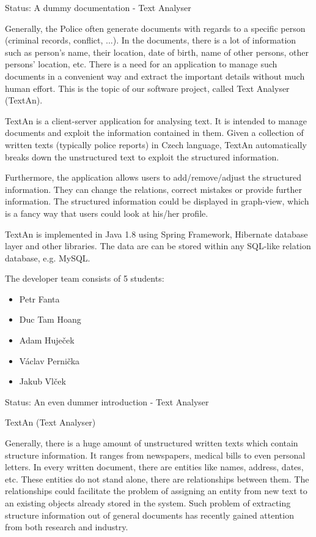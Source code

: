 Status: A dummy documentation - Text Analyser

Generally, the Police often generate documents with regards to a specific person (criminal records, conflict, ...). 
In the documents, there is a lot of information such as
person's name, their location, date of birth, name of other persons, other persons' location, etc.
There is a need for an application to manage such documents in a convenient way and extract the important details without much human effort.
This is the topic of our software project, called Text Analyser (TextAn).

TextAn is a client-server application for analysing text.
It is intended to manage documents and exploit the information contained in them.
Given a collection of written texts (typically police reports) in Czech language,
TextAn automatically breaks down the unstructured text to exploit the structured information. 

Furthermore, the application allows users to add/remove/adjust the structured information.
They can change the relations, correct mistakes or provide further information.
The structured information could be displayed in graph-view,
which is a fancy way that users could look at his/her profile. 

TextAn is implemented in Java 1.8 using Spring Framework, Hibernate database layer and other libraries.
The data are can be stored within any SQL-like relation database, e.g. MySQL.

The developer team consists of 5 students:

\begin{itemize}
\itemsep0em
\item Petr Fanta
\item Duc Tam Hoang
\item Adam Huječek
\item Václav Pernička
\item Jakub Vlček
\end{itemize}

Status: An even dummer introduction - Text Analyser

TextAn (Text Analyser)

Generally, there is a huge amount of unstructured written texts which contain structure information.
It ranges from newspapers, medical bills to even personal letters.
In every written document, there are entities like names, address, dates, etc.
These entities do not stand alone, there are relationships between them.
The relationships could facilitate the problem of assigning an entity from new text to an existing objects already stored in the system.
Such problem of extracting structure information out of general documents has recently gained attention from both research and industry.

